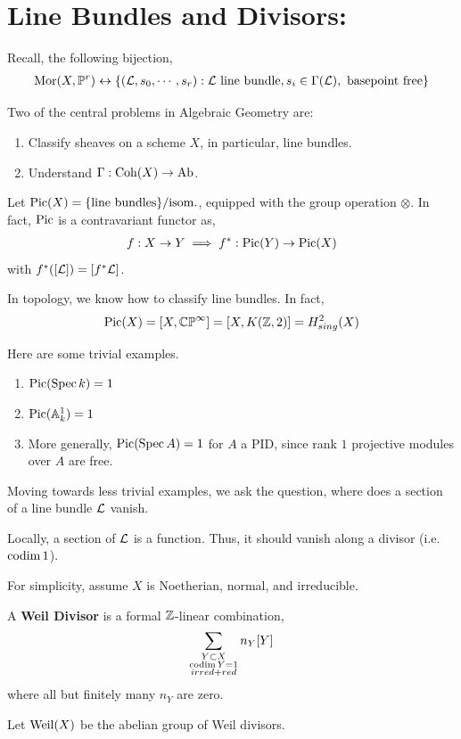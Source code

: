 \documentclass[12pt]{amsart}
\begin{document}


\section{Line Bundles and Divisors:}

Recall, the following bijection, 
\begin{align*}
    \operatorname{Mor}(X, \mathbb P^r) \leftrightarrow \{(\mathcal{L}, s_0, \cdots, s_r) : \mathcal{L} \text{ line bundle}, s_i \in \Gamma(\mathcal{L}), \text{ basepoint free}\}
\end{align*}

Two of the central problems in Algebraic Geometry are:
\begin{enumerate}
    \item Classify sheaves on a scheme $X$, in particular, line bundles.
    \item Understand $\Gamma: \operatorname{Coh}(X) \to \operatorname{Ab}$. 
\end{enumerate}

\begin{definition}
    Let $\operatorname{Pic}(X) = \{\text{line bundles}\}/\text{isom.}$, equipped with the group operation $\otimes$. In fact, $\operatorname{Pic}$ is a contravariant functor as, 
    \begin{align*}
        f: X \to Y \implies f^*: \operatorname{Pic}(Y) \to \operatorname{Pic}(X)
    \end{align*}
    with $f^*([\mathcal{L}]) = [f^*\mathcal{L}]$. 
\end{definition}

In topology, we know how to classify line bundles. In fact, 
\[ \operatorname{Pic}(X) = [X, \mathbb{CP}^\infty] = [X, K(\mathbb Z, 2)] = H^2_{sing}(X)\]

Here are some trivial examples. 
\begin{enumerate}
    \item $\operatorname{Pic}(\operatorname{Spec} k) = 1$
    \item $\operatorname{Pic}(\mathbb A^1_k) = 1$
    \item More generally, $\operatorname{Pic}(\operatorname{Spec} A) = 1$ for $A$ a PID, since rank $1$ projective modules over $A$ are free.  
\end{enumerate}

Moving towards less trivial examples, we ask the question, where does a section of a line bundle $\mathcal{L}$ vanish. 

Locally, a section of $\mathcal{L}$ is a function. Thus, it should vanish along a divisor (i.e. $\operatorname{codim} 1$).

For simplicity, assume $X$ is Noetherian, normal, and irreducible. 

\begin{definition}
    A \textbf{Weil Divisor} is a formal $\mathbb Z$-linear combination, 
    \[ \sum_{\substack{ Y \subset X  \\ \operatorname{codim} Y = 1 \\ irred+red}} n_Y [Y]\]
    where all but finitely many $n_Y$ are zero. 

    Let $\operatorname{Weil}(X)$ be the abelian group of Weil divisors. 
\end{definition}
\end{document}
